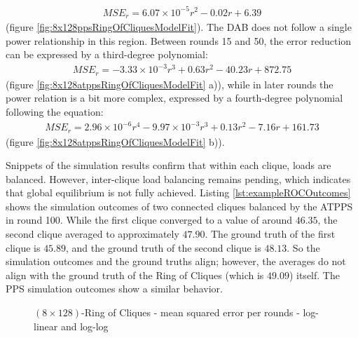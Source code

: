 \begin{align}
    MSE_r=6.07\times 10^{-5}r^{2}-0.02r+6.39    
\end{align}
(figure \ref{fig:8x128ppsRingOfCliquesModelFit}). The DAB does not follow a single power relationship in this region. Between rounds 15 and 50, the error reduction can be expressed by a third-degree polynomial:
\begin{align}
    MSE_r=-3.33\times 10^{-3}r^{3}+0.63r^{2}-40.23r+872.75    
\end{align}
(figure \ref{fig:8x128atppsRingOfCliquesModelFit} a)), while in later rounds the power relation is a bit more complex, expressed by a fourth-degree polynomial following the equation:
\begin{align}
    MSE_r=2.96 \times 10^{-6}r^{4}-9.97\times 10^{-3}r^{3}+0.13r^{2}-7.16r+161.73    
\end{align}
(figure \ref{fig:8x128atppsRingOfCliquesModelFit} b)).

Snippets of the simulation results confirm that within each clique, loads are balanced. However, inter-clique load balancing remains pending, which indicates that global equilibrium is not fully achieved. Listing \ref{lst:exampleROCOutcomes} shows the simulation outcomes of two connected cliques balanced by the ATPPS in round 100. While the first clique converged to a value of around $46.35$, the second clique averaged to approximately $47.90$. The ground truth of the first clique is $45.89$, and the ground truth of the second clique is $48.13$. So the simulation outcomes and the ground truths align; however, the averages do not align with the ground truth of the Ring of Cliques (which is $49.09$) itself. The PPS simulation outcomes show a similar behavior.
\begin{figure}[!ht]
    \centering
    \hfil
    \caption{$(8\times128)$-Ring of Cliques - mean squared error per rounds - log-linear and log-log}
        \label{fig:8x128RingOfCliquesLog_LogLog}
\end{figure}

